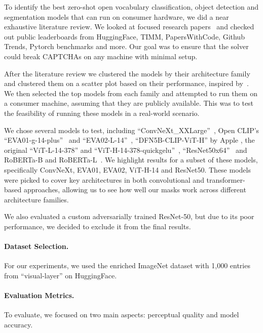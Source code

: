 \documentclass[a4paper, oneside]{discothesis}
\begin{document}
To identify the best zero-shot open vocabulary classification, object detection and segmentation models that can run on consumer hardware, we did a near exhaustive literature review. We looked at focused research papers~\cite{wang2024benchmarking, goldblum2024battle} and checked out public leaderboards from HuggingFace, TIMM, PapersWithCode, Github Trends, Pytorch benchmarks and more. Our goal was to ensure that the solver could break CAPTCHAs on any machine with minimal setup.

After the literature review we clustered the models by their architecture family and clustered them on a scatter plot based on their performance, inspired by~\cite{howard_image_models}. We then selected the top models from each family and attempted to run them on a consumer machine, assuming that they are publicly available. This was to test the feasibility of running these models in a real-world scenario.

We chose several models to test, including ``ConvNeXt\_XXLarge''~\cite{Liu_2022_CVPR}, Open CLIP's ``EVA01-g-14-plus''~\cite{Fang_2023_CVPR} and ``EVA02-L-14''~\cite{fang2024eva}, ``DFN5B-CLIP-ViT-H'' by Apple \cite{fang2023data}, the original ``ViT-L-14-378'' and ``ViT-H-14-378-quickgelu''~\cite{dosovitskiy2021imageworth16x16words}, ``ResNet50x64''~\cite{He_2015_ICCV} and RoBERTa-B and RoBERTa-L~\cite{conneau2020unsupervisedcrosslingualrepresentationlearning}. We highlight results for a subset of these models, specifically ConvNeXt, EVA01, EVA02, ViT-H-14 and ResNet50. These models were picked to cover key architectures in both convolutional and transformer-based approaches, allowing us to see how well our masks work across different architecture families.

We also evaluated a custom adversarially trained ResNet-50, but due to its poor performance, we decided to exclude it from the final results.

\paragraph{Dataset Selection.}

For our experiments, we used the enriched ImageNet dataset with 1,000 entries from ``visual-layer'' on HuggingFace.

\paragraph{Evaluation Metrics.}

To evaluate, we focused on two main aspects: perceptual quality and model accuracy.
\end{document}
